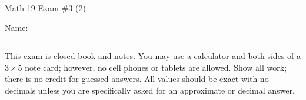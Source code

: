 \documentclass[letterpaper,12pt,fleqn]{article}
\begin{document}
\begin{center}
\Large Math-19 Exam \#3 (2)
\end{center}

\vspace{0.5in}

Name: \rule{4in}{1pt}

\vspace{0.5in}

This exam is closed book and notes. You may use a calculator and both sides of
a $3\times 5$ note card; however, no cell phones or tablets are allowed. Show
all work; there is no credit for guessed answers. All values should be exact
with no decimals unless you are specifically asked for an approximate or
decimal answer.

\vspace{0.5in}
\end{document}
